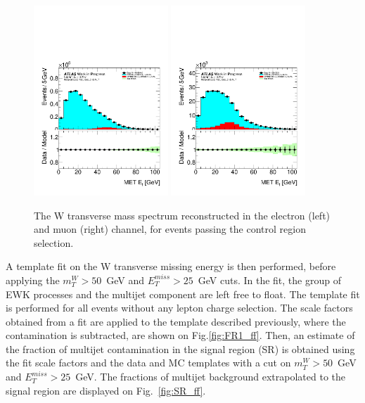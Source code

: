 \begin{figure}[h]
\centering
\includegraphics[width=0.45\textwidth]{figures/SR_MJ/fakeSlices-met_reco_et__M_T-AIso_AID-met_reco_et-antiIsoTight_FakeLepQual-FR2region-el.pdf}
\includegraphics[width=0.45\textwidth]{figures/SR_MJ/fakeSlices-met_reco_et__M_T-AIso_AID-met_reco_et-antiIsoTight_FakeLepQual-FR2region-mu.pdf}
\caption{
The W transverse mass spectrum reconstructed in the electron (left) and muon (right) channel, for events passing the control region selection.
}
\label{fig:FR2_ff}
\end{figure}

A template fit on the W transverse missing energy is then performed, before applying the $m_{T}^{W} > 50$~GeV and $E_{T}^{miss}>25$~GeV cuts.
In the fit, the group of EWK processes and the multijet component are left free to float.
The template fit is performed for all events without any lepton charge selection.
The scale factors obtained from a fit are applied to the template described previously, where the contamination is subtracted, are shown on Fig.\ref{fig:FR1_ff}.
Then, an estimate of the fraction of multijet contamination in the signal region (SR) is obtained
using the fit scale factors and the data and MC templates with a cut on $m_{T}^{W} > 50$~GeV and $E_{T}^{miss}>25$~GeV.
The fractions of multijet background extrapolated to the signal region are displayed on Fig.~\ref{fig:SR_ff}.


